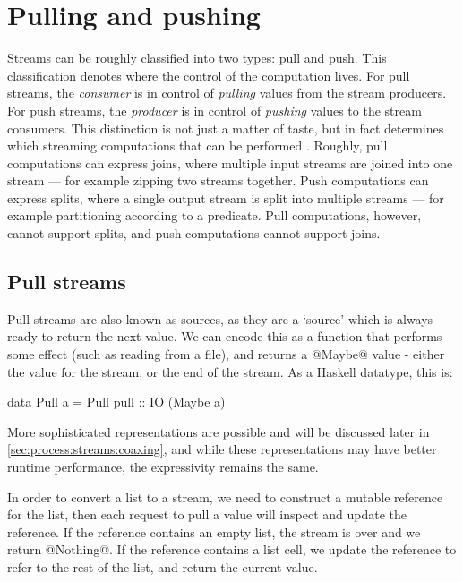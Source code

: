 \chapter{Pulling and pushing}
\label{chapter:process:streams}

Streams can be roughly classified into two types: pull and push.
This classification denotes where the control of the computation lives.
For pull streams, the \emph{consumer} is in control of \emph{pulling} values from the stream producers.
For push streams, the \emph{producer} is in control of \emph{pushing} values to the stream consumers.
This distinction is not just a matter of taste, but in fact determines which streaming computations that can be performed \citep{kay2009you}.
Roughly, pull computations can express joins, where multiple input streams are joined into one stream --- for example zipping two streams together.
Push computations can express splits, where a single output stream is split into multiple streams --- for example partitioning according to a predicate.
Pull computations, however, cannot support splits, and push computations cannot support joins.

\section{Pull streams}
Pull streams are also known as sources, as they are a `source' which is always ready to return the next value.
We can encode this as a function that performs some effect (such as reading from a file), and returns a @Maybe@ value - either the value for the stream, or the end of the stream.
As a Haskell datatype, this is:

\begin{code}
data Pull a
  = Pull
  { pull :: IO (Maybe a) }
\end{code}

More sophisticated representations are possible and will be discussed later in \cref{sec:process:streams:coaxing}, and while these representations may have better runtime performance, the expressivity remains the same.

In order to convert a list to a stream, we need to construct a mutable reference for the list, then each request to pull a value will inspect and update the reference.
If the reference contains an empty list, the stream is over and we return @Nothing@. If the reference contains a list cell, we update the reference to refer to the rest of the list, and return the current value.


